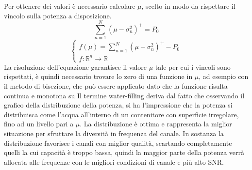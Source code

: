Per ottenere dei valori è necessario calcolare $\mu$, scelto in modo da rispettare il vincolo sulla potenza a disposizione.
\[
    \sum_{n=1}^{N} (\mu - \sigma_n^2)^+ = P_0
\]
\[
    \begin{cases}
        f(\mu) = \sum_{n=1}^{N} (\mu - \sigma_n^2)^+ - P_0 \\
        f: \mathbb{R}^n \rightarrow \mathbb{R}
    \end{cases}
\]
La risoluzione dell'equazione garantisce il valore $\mu$ tale per cui i vincoli sono rispettati, è quindi necessario trovare lo zero di una funzione in $\mu$, ad esempio con il metodo di bisezione, che può essere applicato dato che la funzione risulta continua e monotona su
Il termine water-filling deriva dal fatto che osservando il grafico della distribuzione della potenza, si ha l'impressione che la potenza si distribuisca come l'acqua all'interno di un contenitore con superficie irregolare, fino ad un livello pari a $\mu$.
La distribuzione è ottima e rappresenta la miglior situazione per sfruttare la diversità in frequenza del canale.
In sostanza la distribuzione favorisce i canali con miglior qualità, scartando completamente quelli la cui capacità è troppo bassa, quindi la maggior parte della potenza verrà allocata alle frequenze con le migliori condizioni di canale e più alto SNR.





%
%
%
%
%